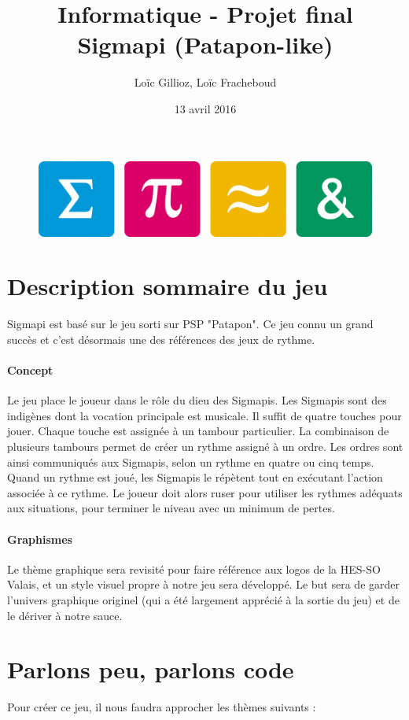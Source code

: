 \documentclass[a4paper,10pt]{article}
\author{Loïc Gillioz, Loïc Fracheboud}
\title{Informatique - Projet final \\ \Huge Sigmapi (Patapon-like)}
\date{13 avril 2016}
\begin{document}
 \maketitle
 \begin{figure}[!h]
 \centering
 \includegraphics[scale=0.15]{images/icones}
 \end{figure}
 \pagebreak
 
 \section{Description sommaire du jeu}
  Sigmapi est basé sur le jeu sorti sur PSP "Patapon". Ce jeu connu un grand succès et c'est désormais une des références des jeux de rythme.
  \paragraph*{Concept}
  Le jeu place le joueur dans le rôle du dieu des Sigmapis. Les Sigmapis sont des indigènes dont la vocation principale est musicale.
Il suffit de quatre touches pour jouer. Chaque touche est assignée à un tambour particulier. La combinaison de plusieurs tambours permet de créer un rythme assigné à un ordre. Les ordres sont ainsi communiqués aux Sigmapis, selon un rythme en quatre ou cinq temps. Quand un rythme est joué, les Sigmapis le répètent tout en exécutant l'action associée à ce rythme. Le joueur doit alors ruser pour utiliser les rythmes adéquats aux situations, pour terminer le niveau avec un minimum de pertes.
  \paragraph*{Graphismes}
Le thème graphique sera revisité pour faire référence aux logos de la HES-SO Valais, et un style visuel propre à notre jeu sera développé. Le but sera de garder l'univers graphique originel (qui a été largement apprécié à la sortie du jeu) et de le dériver à notre sauce.
  \section{Parlons peu, parlons code}
  Pour créer ce jeu, il nous faudra approcher les thèmes suivants :
\end{document}
